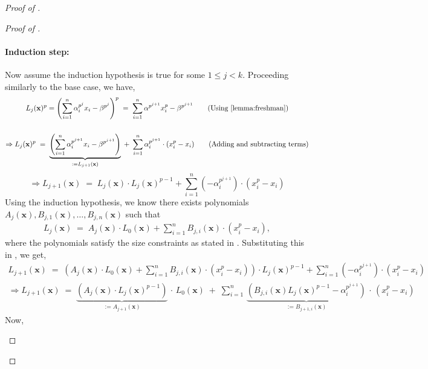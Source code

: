 \documentclass[11pt]{article}
\newcommand{\paren}[1]{\left( #1 \right)}
\begin{document}
\begin{proof}[Proof of ]
\begin{proof}[Proof of ]
\paragraph{Induction step:}Now assume the induction hypothesis is true for some $1 \leq j < k$. Proceeding similarly to the base case, we have,
\begin{gather*}
    L_{j}(\mathbf{x})^{p} = \paren{\sum_{i=1}^{n} \alpha_{i}^{p^{j}} x_{i} - \beta^{p^{j}}}^{p} \; = \; \sum_{i=1}^{n} \alpha^{p^{j+1}} x_{i}^{p} - \beta^{p^{j+1}}\quad \quad (\text{Using \Cref{lemma:freshman}}) \\ \\
   \Rightarrow L_{j}(\mathbf{x})^{p} \; = \; \underbrace{\paren{\sum_{i=1}^{n} \alpha_{i}^{p^{j+1}} x_{i} - \beta^{p^{j+1}}}}_{:= L_{j+1}(\mathbf{x})} \; + \;\sum_{i=1}^{n} \alpha_{i}^{p^{j+1}} \cdot (x_{i}^{p} - x_{i})  \quad \quad (\text{Adding and subtracting terms})
\end{gather*}
\begin{equation}\label{eqn:ubd-constant-induction}
    \Rightarrow L_{j+1}(\mathbf{x}) \; = \; L_{j}(\mathbf{x}) \cdot L_{j}(\mathbf{x})^{p-1} +\sum_{i=1}^{n} (-\alpha_{i}^{p^{j+1}}) \cdot (x_{i}^{p} - x_{i})
\end{equation}
Using the induction hypothesis, we know there exists polynomials $A_{j}(\mathbf{x}), B_{j,1}(\mathbf{x}), \ldots, B_{j,n}(\mathbf{x})$ such that
\begin{align*}
    L_{j}(\mathbf{x}) \; = \; A_{j}(\mathbf{x}) \cdot L_{0}(\mathbf{x}) + \sum_{i=1}^{n} B_{j,i}(\mathbf{x}) \cdot (x_{i}^{p} - x_{i}),
\end{align*}
where the polynomials satisfy the size constraints as stated in . Substituting this in , we get,
\begin{align*}
    L_{j+1}(\mathbf{x}) \; = \; \paren{A_{j}(\mathbf{x}) \cdot L_{0}(\mathbf{x}) + \sum_{i=1}^{n} B_{j,i}(\mathbf{x}) \cdot (x_{i}^{p} - x_{i})} \cdot L_{j}(\mathbf{x})^{p-1} + \sum_{i=1}^{n} (-\alpha_{i}^{p^{j+1}}) \cdot (x_{i}^{p} - x_{i}) \\
    \Rightarrow L_{j+1}(\mathbf{x}) \; = \; \underbrace{(A_{j}(\mathbf{x}) \cdot L_{j}(\mathbf{x})^{p-1})}_{:= A_{j+1}(\mathbf{x})} \, \cdot \, L_{0}(\mathbf{x}) \; + \; \sum_{i=1}^{n} \, \underbrace{(B_{j,i}(\mathbf{x}) L_{j}(\mathbf{x})^{p-1} - \alpha_{i}^{p^{j+1}})}_{:= B_{j+1,i}(\mathbf{x})} \, \cdot \, (x_{i}^{p} - x_{i})
\end{align*}
Now,
\begin{itemize}

\end{itemize}
\end{proof}
\end{proof}
\end{document}

